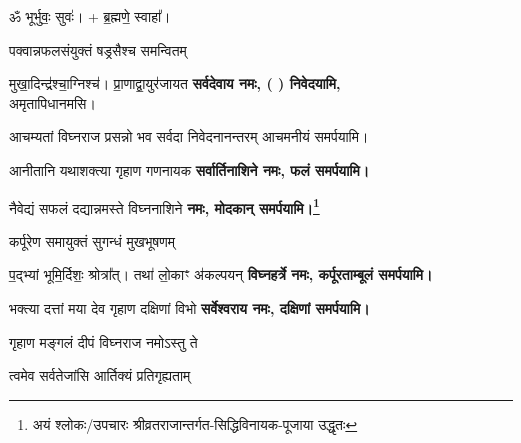 \begin{center}
ॐ भूर्भुवः॒ सुवः॑। + ब्र॒ह्मणे॒ स्वाहा᳚।

{पक्वान्नफलसंयुक्तं षड्रसैश्च समन्वितम्}

{मुखा॒दिन्द्र॑श्चा॒ग्निश्च॑। प्रा॒णाद्वा॒युर॑जायत}
\textbf{सर्वदेवाय नमः, (	) निवेदयामि, \\}
अमृतापिधानमसि।

{आचम्यतां विघ्नराज प्रसन्नो भव सर्वदा}
निवेदनानन्तरम् आचमनीयं समर्पयामि।\medskip




{आनीतानि यथाशक्त्या गृहाण गणनायक}
\textbf{सर्वार्तिनाशिने नमः, फलं समर्पयामि।}
\medskip

{नैवेद्यं सफलं दद्यान्नमस्ते विघ्ननाशिने} 
\textbf{\devAya{} नमः, मोदकान् समर्पयामि।\footnote{अयं श्लोकः/उपचारः श्रीव्रतराजान्तर्गत-सिद्धिविनायक-पूजाया उद्धृतः}
}
\medskip

{कर्पूरेण समायुक्तं सुगन्धं मुखभूषणम्}


{प॒द्भ्यां भूमि॒र्दिशः॒ श्रोत्रा᳚त्। तथा॑ लो॒काꣳ अ॑कल्पयन्}
\textbf{विघ्नहर्त्रे नमः, कर्पूरताम्बूलं समर्पयामि।}
\medskip


{भक्त्या दत्तां मया देव गृहाण दक्षिणां विभो}
\textbf{सर्वेश्वराय नमः, दक्षिणां समर्पयामि।}
\medskip

{गृहाण मङ्गलं दीपं विघ्नराज नमोऽस्तु ते}

{त्वमेव सर्वतेजांसि आर्तिक्यं प्रतिगृह्यताम्} 


\end{center}
